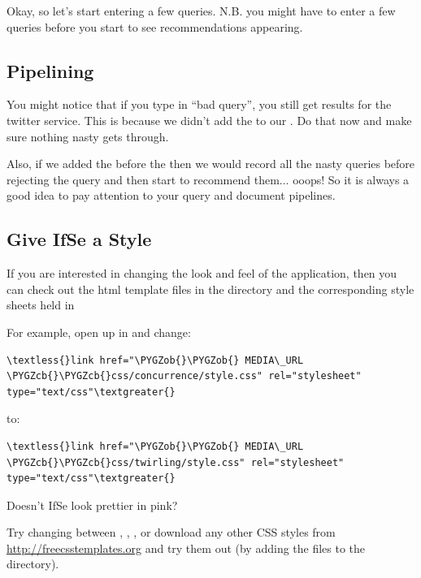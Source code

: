 \documentclass[letterpaper,10pt,english]{sphinxmanual}
\def\PYGZob{\char`\{}
\def\PYGZcb{\char`\}}
\begin{document}
Okay, so let's start entering a few queries. N.B. you might have to enter a few queries before you start to see recommendations appearing.


\subsection{Pipelining}
\label{ifse-tutorial:pipelining}
You might notice that if you type in ``bad query'', you still get results for the twitter service. This is because we didn't add the  to our . Do that now and make sure nothing nasty gets through.

Also, if we added the  before the  then we would record all the nasty queries before rejecting the query and then start to recommend them... ooops! So it is always a good idea to pay attention to your query and document pipelines.


\subsection{Give IfSe a Style}
\label{ifse-tutorial:give-ifse-a-style}
If you are interested in changing the look and feel of the application, then you can check out the html template files in the  directory and the corresponding style sheets held in 

For example, open up  in  and change:

\begin{Verbatim}[commandchars=\\\{\}]
\textless{}link href="\PYGZob{}\PYGZob{} MEDIA\_URL \PYGZcb{}\PYGZcb{}css/concurrence/style.css" rel="stylesheet"  type="text/css"\textgreater{}
\end{Verbatim}

to:

\begin{Verbatim}[commandchars=\\\{\}]
\textless{}link href="\PYGZob{}\PYGZob{} MEDIA\_URL \PYGZcb{}\PYGZcb{}css/twirling/style.css" rel="stylesheet"  type="text/css"\textgreater{}
\end{Verbatim}

Doesn't IfSe look prettier in pink?

Try changing between , , ,  or download any other CSS styles from
\href{http://freecsstemplates.org}{http://freecsstemplates.org} and try them out (by adding the files to the  directory).
\end{document}
